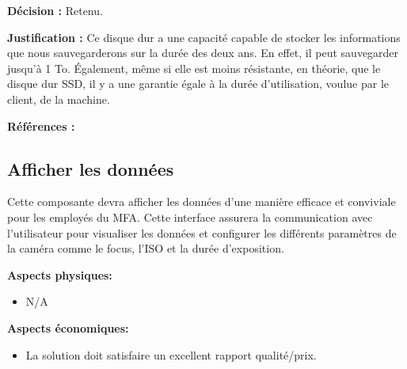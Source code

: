 \textbf{Décision :} Retenu.

\textbf{Justification :} Ce disque dur a une capacité capable de stocker les informations que nous sauvegarderons sur la durée des deux ans. En effet, il peut sauvegarder jusqu’à 1 To. Également, même si elle est moins résistante, en théorie, que le disque dur SSD, il y a une garantie égale à la durée d’utilisation, voulue par le client, de la machine.

\textbf{Références :} \cite{HDD1} \cite{HDD2}

\begin{table}[!htb]
\footnotesize
\centering
{}
\caption{Faisabilité des concepts pour le stockage de données}
\label{t:Decision_stockage}
\end{table}



\subsection{Afficher les données}
Cette composante devra afficher les données d'une manière efficace et conviviale pour les employés du MFA. Cette interface assurera la communication avec l'utilisateur pour visualiser les données et configurer les différents paramètres de la caméra comme le focus, l'ISO et la durée d'exposition. \

\textbf{Aspects physiques:}
\begin{itemize} [label = {--}]
    \item N/A
\end{itemize}

\textbf{Aspects économiques:}
\begin{itemize} [label = {--}]
    \item La solution doit satisfaire un excellent rapport qualité/prix.
\end{itemize}

